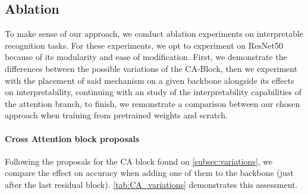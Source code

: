     \subsection{Ablation}
    \label{sec:gen_ablation}
    To make sense of our approach, we conduct ablation experiments on interpretable recognition tasks. For these experiments, we opt to experiment on ResNet50 because of its modularity and ease of modification. First, we demonstrate the differences between the possible variations of the CA-Block, then we experiment with the placement of said  mechanism on a given backbone alongside its effects on interpretability, continuing with an study of the interpretability capabilities of the attention branch, to finish, we remonstrate a comparison between our chosen approach when training from  pretrained weights and scratch.

    \paragraph{Cross Attention block proposals}
    Following the proposals for the CA block found on \autoref{subsec:variations}, we compare the effect on accuracy when adding one of them to the backbone (just after the last residual block). \autoref{tab:CA_variations} demonstrates this assessment.
    
